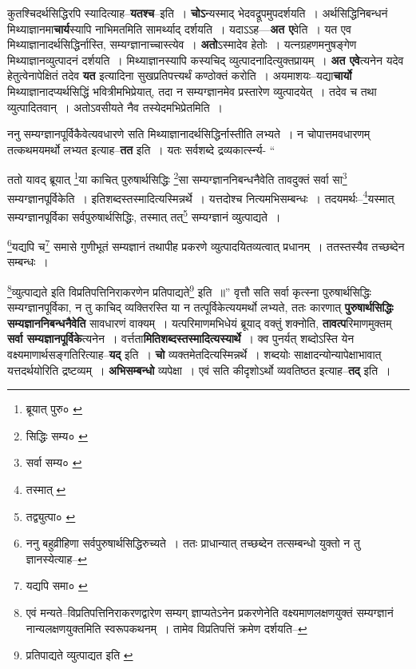 \documentclass[article,12pt,a4paper]{memoir}
\begin{document}
	  \pstart कुतश्चिदर्थसिद्धिरपि स्यादित्याह--\textbf{यतश्च}--इति । \textbf{चोऽ}न्यस्माद् भेदवद्रूपमुपदर्शयति । अर्थसिद्धिनिबन्धनं मिथ्याज्ञानमा\textbf{चार्य}स्यापि नाभिमतमिति सामर्थ्याद् दर्शयति । यदाऽऽह—\textbf{अत ए}वेति । यत एव मिथ्याज्ञानादर्थसिद्धिर्नास्ति, सम्यग्ज्ञानाच्चास्त्येव । \textbf{अतो}ऽस्मादेव हेतोः । यत्नग्रहणमनुषङ्गेण मिथ्याज्ञानव्युत्पादनं दर्शयति । मिथ्याज्ञानस्यापि कस्यचिद् व्युत्पादनादित्युक्तप्रायम् । \textbf{अत एवे}त्यनेन यदेव हेतुत्वेनापेक्षितं तदेव \textbf{यत} इत्यादिना सुखप्रतिपत्त्यर्थं कण्ठोक्तं करोति । अयमाशयः--यद्या\textbf{चार्यो} मिथ्याज्ञानादप्यर्थसिद्धिं भवित्रीमभिप्रेयात्, तदा न सम्यग्ज्ञानमेव प्रस्तारेण व्युत्पादयेत् । तदेव च तथा व्युत्पादितवान् । अतोऽवसीयते नैव तस्येदमभिप्रेतमिति ।
	\pend
      

	  \pstart ननु सम्यग्ज्ञानपूर्विकैवेत्यवधारणे सति मिथ्याज्ञानादर्थसिद्धिर्नास्तीति लभ्यते । न चोपात्तमवधारणम् तत्कथमयमर्थो लभ्यत इत्याह--\textbf{तत} इति । यतः सर्वशब्दे द्रव्यकार्त्स्न्य- \leavevmode{} “
	  
	ततो यावद् ब्रूयात् \footnote{ब्रूयात् पुरु० \cite{dp-msB} \cite{dp-msC} \cite{dp-edP} \cite{dp-edH} \cite{dp-edE}}\-या काचित् पुरुषार्थसिद्धिः \footnote{सिद्धिः सम्य० \cite{dp-msA} \cite{dp-msC} \cite{dp-edP} \cite{dp-edH} \cite{dp-edE}}\-सा सम्यग्ज्ञाननिबन्धनैवेति तावदुक्तं सर्वा सा\footnote{सर्वा सम्य० \cite{dp-msD}} सम्यग्ज्ञानपूर्विकेति । इतिशब्दस्तस्मादित्यस्मिन्नर्थे । यत्तदोश्च नित्यमभिसम्बन्धः । तदयमर्थः--\footnote{तस्मात् \cite{dp-edP}}\-यस्मात् सम्यग्ज्ञानपूर्विका सर्वपुरुषार्थसिद्धिः, तस्मात् तत्\footnote{तद्व्युत्पा० \cite{dp-msA} \cite{dp-edP} \cite{dp-edH} \cite{dp-edE}} सम्यग्ज्ञानं व्युत्पाद्यते । 
	  
	\footnote{ननु बहुव्रीहिणा सर्वपुरुषार्थसिद्धिरुच्यते । ततः प्राधान्यात् तच्छब्देन तत्सम्बन्धो युक्तो न तु ज्ञानस्येत्याह--\cite{dp-msD-n}}\-यद्यपि च\footnote{यद्यपि समा० \cite{dp-msC}} समासे गुणीभूतं सम्यज्ञानं तथापीह प्रकरणे व्युत्पादयितव्यत्वात् प्रधानम् । ततस्तस्यैव तच्छब्देन सम्बन्धः । 
	  
	\footnote{एवं मन्यते--विप्रतिपत्तिनिराकरणद्वारेण सम्यग् ज्ञाप्यतेऽनेन प्रकरणेनेति वक्ष्यमाणलक्षणयुक्तं सम्यग्ज्ञानं नान्यलक्षणयुक्तमिति स्वरूपकथनम् । तामेव विप्रतिपत्तिं क्रमेण दर्शयति--\cite{dp-msD-n}}\-व्युत्पाद्यते इति विप्रतिपत्तिनिराकरणेन प्रतिपाद्यते\footnote{प्रतिपाद्यते व्युत्पाद्यत इति \cite{dp-edE} \cite{dp-edP}} इति ॥” वृत्तौ सति सर्वा कृत्स्ना पुरुषार्थसिद्धिः सम्यग्ज्ञानपूर्विका, न तु काचिद् व्यक्तिरस्ति या न तत्पूर्विकेत्ययमर्थो लभ्यते, ततः कारणात् \textbf{पुरुषार्थसिद्धिः सम्यज्ञाननिबन्धनैवेति} सावधारणं वाक्यम् । यत्परिमाणमभिधेयं ब्रूयाद् वक्तुं शक्नोति, \textbf{तावत्प}रिमाणमुक्तम् \textbf{सर्वा सम्यज्ञानपूर्विके}त्यनेन । वर्त्तता\textbf{मितिशब्दस्तस्मादित्यस्यार्थे} । क्व पुनर्यत् शब्दोऽस्ति येन वक्ष्यमाणार्थसङ्गतिरित्याह--\textbf{यद्} इति । \textbf{चो} \leavevmode{} व्यक्तमेतदित्यस्मिन्नर्थे । शब्दयोः साक्षादन्योन्यापेक्षाभावात् यत्तदर्थयोरिति द्रष्टव्यम् । \textbf{अभिसम्बन्धो} व्यपेक्षा । एवं सति कीदृशोऽर्थो व्यवतिष्ठत इत्याह--\textbf{तद्} इति ।
	\pend
      
\end{document}
